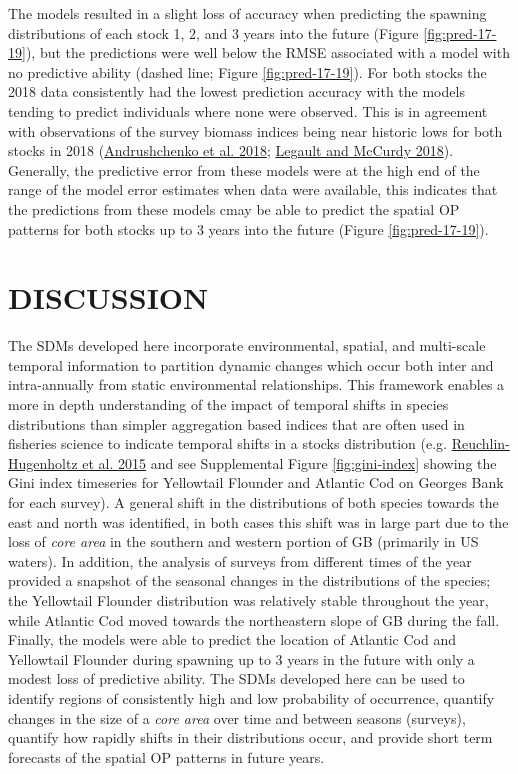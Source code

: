 \documentclass[
]{article}
\begin{document}
The models resulted in a slight loss of accuracy when predicting the spawning distributions of each stock 1, 2, and 3 years into the future (Figure \ref{fig:pred-17-19}), but the predictions were well below the RMSE associated with a model with no predictive ability (dashed line; Figure \ref{fig:pred-17-19}). For both stocks the 2018 data consistently had the lowest prediction accuracy with the models tending to predict individuals where none were observed. This is in agreement with observations of the survey biomass indices being near historic lows for both stocks in 2018 (\protect\hyperlink{ref-andrushchenkoAssessmentEasternGeorges2018}{Andrushchenko et al. 2018}; \protect\hyperlink{ref-legaultStockAssessmentGeorges2018}{Legault and McCurdy 2018}). Generally, the predictive error from these models were at the high end of the range of the model error estimates when data were available, this indicates that the predictions from these models cmay be able to predict the spatial OP patterns for both stocks up to 3 years into the future (Figure \ref{fig:pred-17-19}).

\hypertarget{discussion}{%
\section{DISCUSSION}\label{discussion}}

The SDMs developed here incorporate environmental, spatial, and multi-scale temporal information to partition dynamic changes which occur both inter and intra-annually from static environmental relationships. This framework enables a more in depth understanding of the impact of temporal shifts in species distributions than simpler aggregation based indices that are often used in fisheries science to indicate temporal shifts in a stocks distribution (e.g. \protect\hyperlink{ref-reuchlin-hugenholtzPotentialSpatialDistribution2015}{Reuchlin-Hugenholtz et al. 2015} and see Supplemental Figure \ref{fig:gini-index} showing the Gini index timeseries for Yellowtail Flounder and Atlantic Cod on Georges Bank for each survey). A general shift in the distributions of both species towards the east and north was identified, in both cases this shift was in large part due to the loss of \emph{core area} in the southern and western portion of GB (primarily in US waters). In addition, the analysis of surveys from different times of the year provided a snapshot of the seasonal changes in the distributions of the species; the Yellowtail Flounder distribution was relatively stable throughout the year, while Atlantic Cod moved towards the northeastern slope of GB during the fall. Finally, the models were able to predict the location of Atlantic Cod and Yellowtail Flounder during spawning up to 3 years in the future with only a modest loss of predictive ability. The SDMs developed here can be used to identify regions of consistently high and low probability of occurrence, quantify changes in the size of a \emph{core area} over time and between seasons (surveys), quantify how rapidly shifts in their distributions occur, and provide short term forecasts of the spatial OP patterns in future years.
\end{document}
